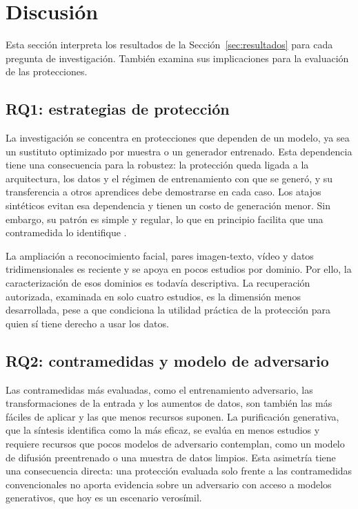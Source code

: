 \section{Discusión}\label{sec:discusion}

Esta sección interpreta los resultados de la Sección~\ref{sec:resultados} para cada pregunta de investigación. También examina sus implicaciones para la evaluación de las protecciones.

\subsection{RQ1: estrategias de protección}

La investigación se concentra en protecciones que dependen de un modelo, ya sea un sustituto optimizado por muestra o un generador entrenado. Esta dependencia tiene una consecuencia para la robustez: la protección queda ligada a la arquitectura, los datos y el régimen de entrenamiento con que se generó, y su transferencia a otros aprendices debe demostrarse en cada caso. Los atajos sintéticos evitan esa dependencia y tienen un costo de generación menor. Sin embargo, su patrón es simple y regular, lo que en principio facilita que una contramedida lo identifique \cite{S0043}.

La ampliación a reconocimiento facial, pares imagen-texto, vídeo y datos tridimensionales es reciente y se apoya en pocos estudios por dominio. Por ello, la caracterización de esos dominios es todavía descriptiva. La recuperación autorizada, examinada en solo cuatro estudios, es la dimensión menos desarrollada, pese a que condiciona la utilidad práctica de la protección para quien sí tiene derecho a usar los datos.

\subsection{RQ2: contramedidas y modelo de adversario}

Las contramedidas más evaluadas, como el entrenamiento adversario, las transformaciones de la entrada y los aumentos de datos, son también las más fáciles de aplicar y las que menos recursos suponen. La purificación generativa, que la síntesis identifica como la más eficaz, se evalúa en menos estudios y requiere recursos que pocos modelos de adversario contemplan, como un modelo de difusión preentrenado o una muestra de datos limpios. Esta asimetría tiene una consecuencia directa: una protección evaluada solo frente a las contramedidas convencionales no aporta evidencia sobre un adversario con acceso a modelos generativos, que hoy es un escenario verosímil.

